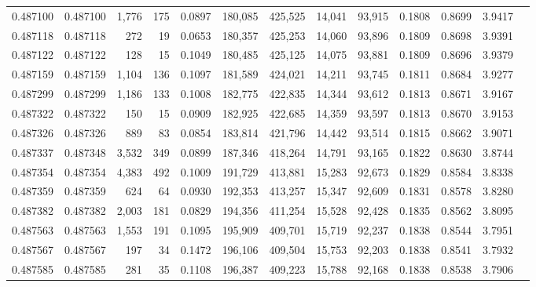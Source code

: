 \begin{tabular}{rrrrrrrrrrrrr}
0.487100 & 0.487100 & 1,776 &   175 &                                     0.0897 & 180,085 & 425,525 &  14,041 &  93,915 & 0.1808 & 0.8699 & 3.9417 \\
0.487118 & 0.487118 &   272 &    19 &                                     0.0653 & 180,357 & 425,253 &  14,060 &  93,896 & 0.1809 & 0.8698 & 3.9391 \\
0.487122 & 0.487122 &   128 &    15 &                                     0.1049 & 180,485 & 425,125 &  14,075 &  93,881 & 0.1809 & 0.8696 & 3.9379 \\
0.487159 & 0.487159 & 1,104 &   136 &                                     0.1097 & 181,589 & 424,021 &  14,211 &  93,745 & 0.1811 & 0.8684 & 3.9277 \\
0.487299 & 0.487299 & 1,186 &   133 &                                     0.1008 & 182,775 & 422,835 &  14,344 &  93,612 & 0.1813 & 0.8671 & 3.9167 \\
0.487322 & 0.487322 &   150 &    15 &                                     0.0909 & 182,925 & 422,685 &  14,359 &  93,597 & 0.1813 & 0.8670 & 3.9153 \\
0.487326 & 0.487326 &   889 &    83 &                                     0.0854 & 183,814 & 421,796 &  14,442 &  93,514 & 0.1815 & 0.8662 & 3.9071 \\
0.487337 & 0.487348 & 3,532 &   349 &                                     0.0899 & 187,346 & 418,264 &  14,791 &  93,165 & 0.1822 & 0.8630 & 3.8744 \\
0.487354 & 0.487354 & 4,383 &   492 &                                     0.1009 & 191,729 & 413,881 &  15,283 &  92,673 & 0.1829 & 0.8584 & 3.8338 \\
0.487359 & 0.487359 &   624 &    64 &                                     0.0930 & 192,353 & 413,257 &  15,347 &  92,609 & 0.1831 & 0.8578 & 3.8280 \\
0.487382 & 0.487382 & 2,003 &   181 &                                     0.0829 & 194,356 & 411,254 &  15,528 &  92,428 & 0.1835 & 0.8562 & 3.8095 \\
0.487563 & 0.487563 & 1,553 &   191 &                                     0.1095 & 195,909 & 409,701 &  15,719 &  92,237 & 0.1838 & 0.8544 & 3.7951 \\
0.487567 & 0.487567 &   197 &    34 &                                     0.1472 & 196,106 & 409,504 &  15,753 &  92,203 & 0.1838 & 0.8541 & 3.7932 \\
0.487585 & 0.487585 &   281 &    35 &                                     0.1108 & 196,387 & 409,223 &  15,788 &  92,168 & 0.1838 & 0.8538 & 3.7906 \\

\end{tabular}
